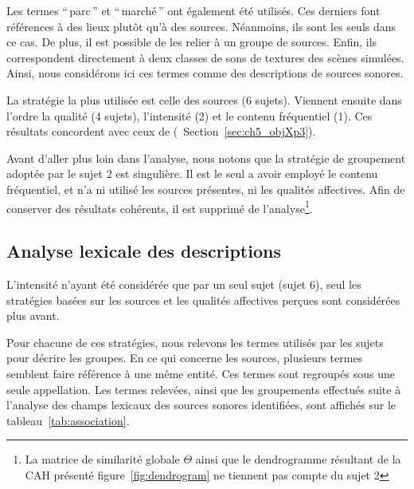 Les termes ``\,parc\,'' et ``\,marché\,'' ont également été utilisés. Ces derniers font références à des lieux plutôt qu'à des sources. Néanmoins, ils sont les seuls dans ce cas. De plus, il est possible de les relier à un groupe de sources. Enfin, ils correspondent directement à deux classes de sons de textures des scènes simulées. Ainsi, nous considérons ici ces termes comme des descriptions de sources sonores.

La stratégie la plus utilisée est celle des sources (6 sujets). Viennent ensuite dans l'ordre la qualité (4 sujets), l'intensité (2) et le contenu fréquentiel (1). Ces résultats concordent avec ceux de \cite{maffiolo_caracterisation_1999} (\cf~Section~\ref{sec:ch5_objXp3}).

Avant d'aller plus loin dans l'analyse, nous notons que la stratégie de groupement adoptée par le sujet 2 est singulière. Il est le seul a avoir employé le contenu fréquentiel, et n'a ni utilisé les sources présentes, ni les qualités affectives. Afin de conserver des résultats cohérents, il est supprimé de l'analyse\footnote{La matrice de similarité globale $\Theta$ ainsi que le dendrogramme résultant de la CAH présenté figure~\ref{fig:dendrogram} ne tiennent pas compte du sujet 2}. 

\subsection{Analyse lexicale des descriptions}
\label{sec:ch5_xp3AnalyseLexicale}

L'intensité n'ayant été considérée que par un seul sujet (sujet 6), seul les stratégies basées sur les sources et les qualités affectives perçues sont considérées plus avant.

Pour chacune de ces stratégies, nous relevons les termes utilisés par les sujets pour décrire les groupes. En ce qui concerne les sources, plusieurs termes semblent faire référence à une même entité. Ces termes sont regroupés sous une seule appellation. Les termes relevées, ainsi que les groupements effectués suite à l'analyse des champs lexicaux des sources sonores identifiées, sont affichés sur le tableau~\ref{tab:association}.


